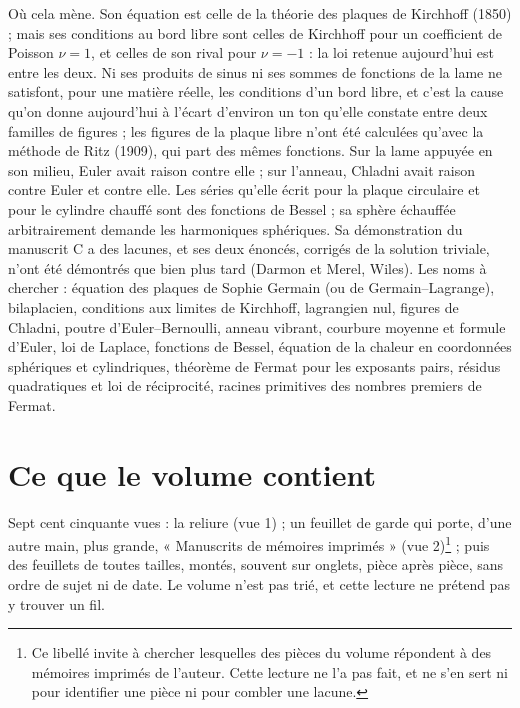 \documentclass[11pt,a4paper]{article}
\begin{document}
\begin{resume}
Où cela mène. Son équation est celle de la théorie des plaques de Kirchhoff
(1850) ; mais ses conditions au bord libre sont celles de Kirchhoff pour un
coefficient de Poisson $\nu = 1$, et celles de son rival pour $\nu = -1$ : la loi
retenue aujourd'hui est entre les deux. Ni ses produits de sinus ni ses sommes de
fonctions de la lame ne satisfont, pour une matière réelle, les conditions d'un
bord libre, et
c'est la cause qu'on donne aujourd'hui à l'écart d'environ un ton qu'elle
constate entre deux familles de figures ; les figures de la plaque libre n'ont été
calculées qu'avec la méthode de Ritz (1909), qui part des mêmes fonctions. Sur la
lame appuyée en son milieu, Euler avait raison contre elle ; sur l'anneau, Chladni avait
raison contre Euler et contre elle. Les séries qu'elle écrit pour la plaque
circulaire et pour le cylindre chauffé sont des fonctions de Bessel ; sa sphère
échauffée arbitrairement demande les harmoniques sphériques. Sa démonstration du
manuscrit C a des lacunes, et ses deux énoncés, corrigés de la solution triviale,
n'ont été démontrés que bien plus tard (Darmon et Merel, Wiles). Les noms à
chercher : équation des plaques de Sophie Germain (ou de Germain--Lagrange),
bilaplacien, conditions aux limites de Kirchhoff, lagrangien nul, figures de
Chladni, poutre d'Euler--Bernoulli, anneau vibrant, courbure moyenne et formule
d'Euler, loi de Laplace, fonctions de Bessel, équation de la chaleur en
coordonnées sphériques et cylindriques, théorème de Fermat pour les exposants
pairs, résidus quadratiques et loi de réciprocité, racines primitives des nombres
premiers de Fermat.

\end{resume}

\section*{Ce que le volume contient}

Sept cent cinquante vues : la reliure (vue 1) ; un feuillet de garde qui porte,
d'une autre main, plus grande, « Manuscrits de mémoires imprimés » (vue
2)\footnote{Ce libellé invite à chercher lesquelles des pièces du volume
répondent à des mémoires imprimés de l'auteur. Cette lecture ne l'a pas fait, et
ne s'en sert ni pour identifier une pièce ni pour combler une lacune.} ; puis des
feuillets de toutes tailles, montés, souvent sur onglets, pièce après pièce, sans
ordre de sujet ni de date. Le volume n'est pas trié, et cette lecture ne prétend
pas y trouver un fil.
\end{document}
